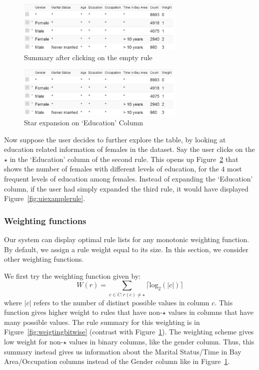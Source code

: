 \documentclass[10pt,journal,compsoc]{IEEEtran}
\begin{document}
\begin{figure}
\centering
\includegraphics[width=80mm,frame]{graphs/screenshots6col/empty_expansion.jpg}
\caption{Summary after clicking on the empty rule \label{fig:uiexample1}}
\vspace{-10pt}
\end{figure} 

\begin{figure}
\centering
\includegraphics[width=80mm,frame]{graphs/screenshots6col/empty_expansion.jpg}
\caption{Star expansion on `Education' Column \label{fig:uiexamplestar}}
\vspace{-10pt}
\end{figure}

Now suppose the user decides to further explore the table, by looking at education related information of females in the dataset. Say the user clicks on the $\star$ in the `Education' column of the second rule. This opens up Figure~\ref{fig:uiexamplestar} that shows the number of females with different levels of education, for the $4$ most frequent levels of education among females. Instead of expanding the `Education' column, if the user had simply expanded the third rule, it would have displayed Figure~\ref{fig:uiexamplerule}. 

\subsubsection{Weighting functions}
Our system can display optimal rule lists for any monotonic weighting function. By default, we assign a rule weight equal to its size. In this section, we consider other weighting functions. 

We first try the weighting function given by:
$$W(r) = \sum_{c \in C : r(c) \neq \star} \lceil \text{log}_2(|c|) \rceil$$ where $|c|$ refers to the number of distinct possible values in column $c$. This function gives higher weight to rules that have non-$\star$ values in columns that have many possible values. The rule summary for this weighting is in Figure~\ref{fig:weigtingbitwise} (contrast with Figure~\ref{fig:uiexample1}). The weighting scheme gives low weight for non-$\star$ values in binary columns, like the gender column. Thus, this summary instead gives us information about the Marital Status/Time in Bay Area/Occupation columns instead of the Gender column like in Figure~\ref{fig:uiexample1}.  
\end{document}
